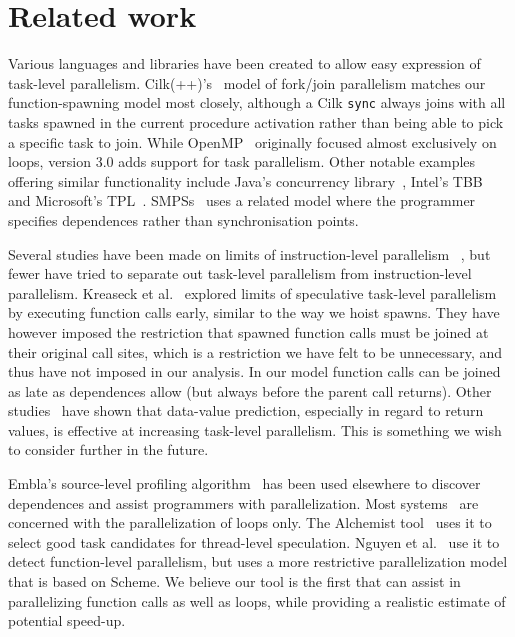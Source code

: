 \section{Related work}

Various languages and libraries have been created to allow easy
expression of task-level parallelism.  Cilk(++)'s~\cite{blumofe96cilk,leiserson09cilk}
model of fork/join parallelism matches our function-spawning model
most closely, although a Cilk {\tt sync} always joins with all tasks 
spawned in the current procedure activation rather than being able to 
pick a specific task to join. While OpenMP~\cite{dagum98openmp} 
originally focused almost exclusively on loops, version 3.0 adds 
support for task parallelism.  Other notable examples
offering similar functionality 
include Java's concurrency library~\cite{lea00java}, Intel's
TBB~\cite{reinders07intel} and Microsoft's
TPL~\cite{leijen07parallel}.
SMPSs~\cite{perez08dependency} uses a related model where the programmer
specifies dependences rather than synchronisation points.

Several studies have been made on limits of instruction-level parallelism~
\cite{wall91limits,postiff99limits},
but fewer have tried to separate out task-level
parallelism from instruction-level parallelism.  Kreaseck et al.\
 explored limits of speculative task-level
parallelism by executing function calls early, similar to the
way we hoist spawns.  They have however imposed the restriction that
spawned function calls must be joined at their original call sites,
which is a restriction we have felt to be unnecessary, and thus have
not imposed in our analysis.  In our model function calls can be
joined as late as dependences allow (but always before the parent
call returns).  Other studies~\cite{warg01limits,oplinger99insearch}
have shown that data-value prediction, especially in regard to return
values, is effective at increasing task-level parallelism.  This is
something we wish to consider further in the future.

Embla's source-level profiling algorithm~\cite{embla:08} has been used 
elsewhere to discover dependences and assist programmers with parallelization.
Most systems~\cite{wu08compiler,tournavitis09towards,larus93loop}
are concerned with the parallelization of loops only.
The Alchemist tool~\cite{zhang09alchemist} uses it
to select good task candidates for thread-level speculation.
Nguyen et al.~\cite{nguyen02parallelizing} use it to detect function-level parallelism,
but uses a more restrictive parallelization model that is based on Scheme.
We believe our tool is the first that can assist in parallelizing function calls as well as loops,
while providing a realistic estimate of potential speed-up.

